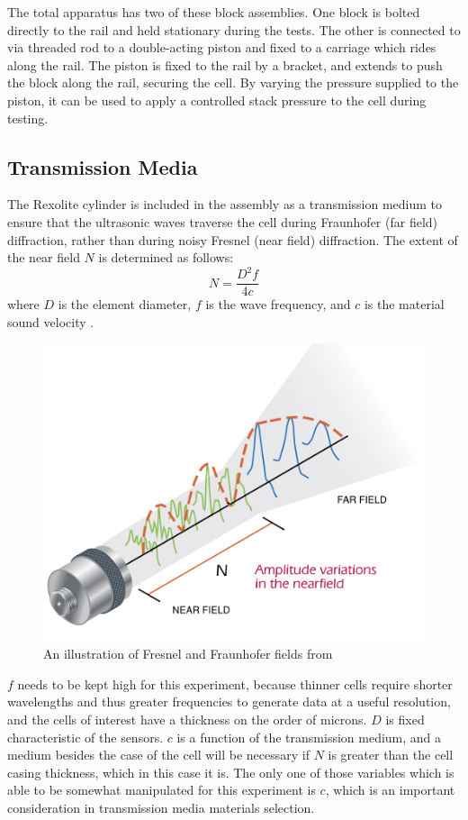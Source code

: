 The total apparatus has two of these block assemblies. One block is bolted directly to the rail and held stationary during the tests. The other is connected to via threaded rod to a double-acting piston and fixed to a carriage which rides along the rail. The piston is fixed to the rail by a bracket, and extends to push the block along the rail, securing the cell. By varying the pressure supplied to the piston, it can be used to apply a controlled stack pressure to the cell during testing.

\subsection{Transmission Media}
The Rexolite cylinder is included in the assembly as a transmission medium to ensure that the ultrasonic waves traverse the cell during Fraunhofer (far field) diffraction, rather than during noisy Fresnel (near field) diffraction. The extent of the near field $N$ is determined as follows:
$$\label{eq:nearfield} N= \frac{D^2 f} {4c} $$
where $D$ is the element diameter, $f$ is the wave frequency, and $c$ is the material sound velocity \cite{OLYMPUS}.
\begin{figure}[t]\label{fig:fieldEffects}
\includegraphics[]{fields-olympus-45}
\centering
\caption{An illustration of Fresnel and Fraunhofer fields from \cite{OLYMPUS}}
\end{figure}
$f$ needs to be kept high for this experiment, because thinner cells require shorter wavelengths and thus greater frequencies to generate data at a useful resolution, and the cells of interest have a thickness on the order of microns. $D$ is fixed characteristic of the sensors. $c$ is a function of the transmission medium, and a medium besides the case of the cell will be necessary if $N$ is greater than the cell casing thickness, which in this case it is. The only one of those variables which is able to be somewhat manipulated for this experiment is $c$, which is an important consideration in transmission media materials selection. 
